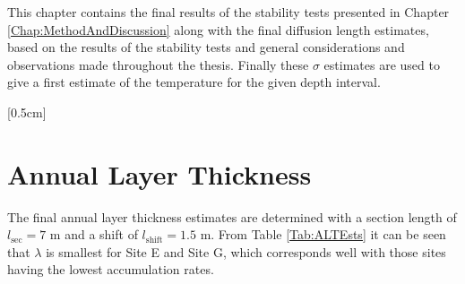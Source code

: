 \documentclass[../../CompleteThesis2/Complete_2ndDraft]{subfiles}
\begin{document}
This chapter contains the final results of the stability tests presented in Chapter \ref{Chap:MethodAndDiscussion} along with the final diffusion length estimates, based on the results of the stability tests and general considerations and observations made throughout the thesis. Finally these $\sigma$ estimates are used to give a first estimate of the temperature for the given depth interval.

\minitoc

[0.5cm]%


\section[Annual Layer Thickness]{Annual Layer Thickness}
\label{Sec:Results_ALT}

The final annual layer thickness estimates are determined with a section length of $l_{\text{sec}}=7$ m and a shift of $l_{\text{shift}}=1.5$ m. From Table \ref{Tab:ALTEsts} it can be seen that $\lambda$ is smallest for Site E and Site G, which corresponds well with those sites having the lowest accumulation rates.
\end{document}
